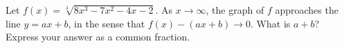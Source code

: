 Let $f(x)=\sqrt[3]{8x^3-7x^2-4x-2}$. As $x\to\infty$, the graph of $f$ approaches the line $y=ax+b$, in the sense that $f(x)-(ax+b)\to0$. What is $a+b$? Express your answer as a common fraction.
